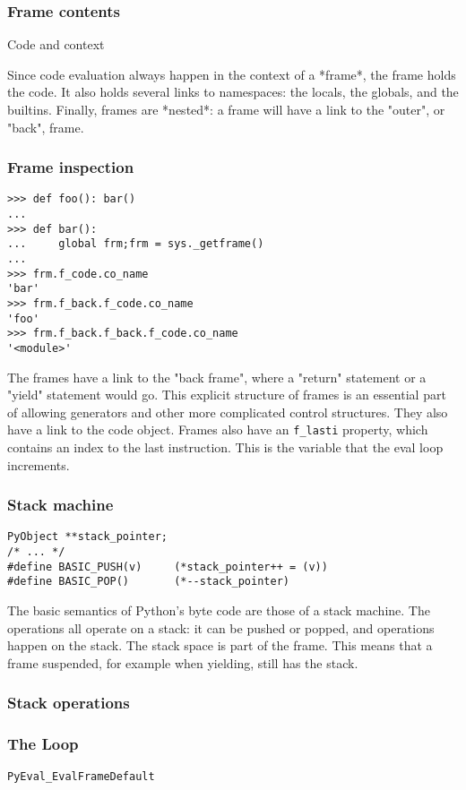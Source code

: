 \begin{frame}
\frametitle{Frame contents}

Code and context
\end{frame}

Since code evaluation always happen in the context of a
*frame*,
the frame holds the code.
It also holds several links to namespaces:
the locals, the globals, and the builtins.
Finally,
frames are
*nested*:
a frame will have a link to the "outer",
or "back",
frame.



\begin{frame}
\frametitle{Frame inspection}

\begin{lstlisting}
>>> def foo(): bar()
... 
>>> def bar():
...     global frm;frm = sys._getframe()
... 
>>> frm.f_code.co_name
'bar'
>>> frm.f_back.f_code.co_name
'foo'
>>> frm.f_back.f_back.f_code.co_name
'<module>'
\end{lstlisting}
\end{frame}

The frames have a link to the "back frame",
where a "return" statement or a "yield" statement would go.
This explicit structure of frames is an essential part of allowing
generators and other more complicated control structures.
They also have a link to the code object.
Frames also have an \verb|f_lasti| property,
which contains an index to the last instruction.
This is the variable that the eval loop increments.

\begin{frame}
\frametitle{Stack machine}

\begin{lstlisting}
PyObject **stack_pointer;
/* ... */
#define BASIC_PUSH(v)     (*stack_pointer++ = (v))
#define BASIC_POP()       (*--stack_pointer)
\end{lstlisting}
\end{frame}

The basic semantics of Python's byte code are those of a stack machine.
The operations all operate on a stack:
it can be pushed or popped,
and operations happen on the stack.
The stack space is part of the frame.
This means that a frame suspended,
for example when yielding,
still has the stack.

\begin{frame}
\frametitle{Stack operations}
\end{frame}

\begin{frame}[fragile]
\frametitle{The Loop}
\verb|PyEval_EvalFrameDefault|
\end{frame}

